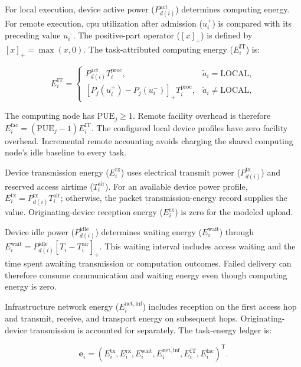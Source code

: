 \documentclass[journal]{IEEEtran}
\begin{document}
For local execution, device active power (\(P_{d(i)}^{\mathrm{act}}\)) determines computing energy. For remote execution, \acs{cpu} utilization after admission (\(u_i^{+}\)) is compared with its preceding value \(u_i^{-}\). The positive-part operator (\([x]_+\)) is defined by \([x]_+=\max(x,0)\). The task-attributed computing energy (\(E_i^{\mathrm{IT}}\)) is:

\begin{equation}
\label{eq:computing-energy}
E_i^{\mathrm{IT}}
=
\begin{cases}
P_{d(i)}^{\mathrm{act}}T_i^{\mathrm{proc}},
&\tilde a_i=\mathrm{LOCAL},\\[1mm]
\left[
P_j(u_i^{+})-P_j(u_i^{-})
\right]_+
T_i^{\mathrm{proc}},
&\tilde a_i\neq\mathrm{LOCAL},
\end{cases}
\end{equation}

The computing node has \(\mathrm{PUE}_j\geq1\). Remote facility overhead is therefore \(E_i^{\mathrm{fac}}=(\mathrm{PUE}_j-1)E_i^{\mathrm{IT}}\). The configured local device profiles have zero facility overhead. Incremental remote accounting avoids charging the shared computing node’s idle baseline to every task.

Device transmission energy (\(E_i^{\mathrm{tx}}\)) uses electrical transmit power (\(P_{d(i)}^{\mathrm{tx}}\)) and reserved access airtime (\(T_i^{\mathrm{air}}\)). For an available device power profile, \(E_i^{\mathrm{tx}}=P_{d(i)}^{\mathrm{tx}}T_i^{\mathrm{air}}\); otherwise, the packet transmission-energy record supplies the value. Originating-device reception energy (\(E_i^{\mathrm{rx}}\)) is zero for the modeled upload.

Device idle power (\(P_{d(i)}^{\mathrm{idle}}\)) determines waiting energy (\(E_i^{\mathrm{wait}}\)) through \(E_i^{\mathrm{wait}}=P_{d(i)}^{\mathrm{idle}}[T_i-T_i^{\mathrm{air}}]_+\). This waiting interval includes access waiting and the time spent awaiting transmission or computation outcomes. Failed delivery can therefore consume communication and waiting energy even though computing energy is zero.

Infrastructure network energy (\(E_i^{\mathrm{net,inf}}\)) includes reception on the first access hop and transmit, receive, and transport energy on subsequent hops. Originating-device transmission is accounted for separately. The task-energy ledger is:

\[
\mathbf e_i=
\left(
E_i^{\mathrm{tx}},
E_i^{\mathrm{rx}},
E_i^{\mathrm{wait}},
E_i^{\mathrm{net,inf}},
E_i^{\mathrm{IT}},
E_i^{\mathrm{fac}}
\right)^{\mathsf T}.
\]
\end{document}
